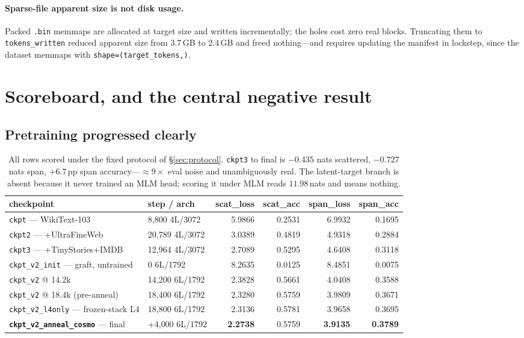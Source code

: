 \documentclass[11pt,a4paper]{article}
\newcommand{\nats}[1]{\ensuremath{#1}\,nats}
\begin{document}
\paragraph{Sparse-file apparent size is not disk usage.} Packed \texttt{.bin} memmaps are
allocated at target size and written incrementally; the holes cost zero real blocks.
Truncating them to \texttt{tokens\_written} reduced apparent size from 3.7\,GB to 2.4\,GB and
freed nothing---and requires updating the manifest in lockstep, since the dataset memmaps with
\texttt{shape=(target\_tokens,)}.

\section{Scoreboard, and the central negative result}\label{sec:scoreboard}

\subsection{Pretraining progressed clearly}

\begin{table}[H]
\centering\footnotesize\setlength{\tabcolsep}{4.5pt}
\begin{tabular}{llrrrr}
\toprule
checkpoint & step / arch & scat\_loss & scat\_acc & span\_loss & span\_acc \\
\midrule
\texttt{ckpt} --- WikiText-103            & 8{,}800 \; 4L/3072  & 5.9866 & 0.2531 & 6.9932 & 0.1695 \\
\texttt{ckpt2} --- +UltraFineWeb          & 20{,}789 \; 4L/3072 & 3.0389 & 0.4819 & 4.9318 & 0.2884 \\
\texttt{ckpt3} --- +TinyStories+IMDB      & 12{,}964 \; 4L/3072 & 2.7089 & 0.5295 & 4.6408 & 0.3118 \\
\texttt{ckpt\_v2\_init} --- graft, untrained & 0 \; 6L/1792     & 8.2635 & 0.0125 & 8.4851 & 0.0075 \\
\texttt{ckpt\_v2} @ 14.2k                 & 14{,}200 \; 6L/1792 & 2.3828 & 0.5661 & 4.0408 & 0.3588 \\
\texttt{ckpt\_v2} @ 18.4k (pre-anneal)    & 18{,}400 \; 6L/1792 & 2.3280 & 0.5759 & 3.9809 & 0.3671 \\
\texttt{ckpt\_v2\_l4only} --- frozen-stack L4 & 18{,}800 \; 6L/1792 & 2.3136 & 0.5781 & 3.9658 & 0.3695 \\
\textbf{\texttt{ckpt\_v2\_anneal\_cosmo}} --- final & +4{,}000 \; 6L/1792 & \textbf{2.2738} & 0.5759 & \textbf{3.9135} & \textbf{0.3789} \\
\bottomrule
\end{tabular}
\caption{All rows scored under the fixed protocol of \S\ref{sec:protocol}. \texttt{ckpt3} to
final is $-0.435$ nats scattered, $-0.727$ nats span, $+6.7$\,pp span accuracy---$\approx9\times$
eval noise and unambiguously real. The latent-target branch is absent because it never trained
an MLM head; scoring it under MLM reads \nats{11.98} and means nothing.}
\end{table}
\end{document}
